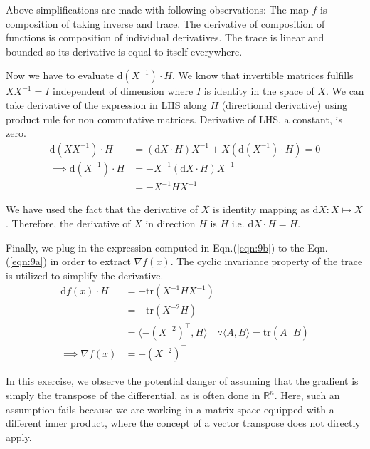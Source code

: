 \documentclass{article}
\begin{document}
\begin{enumerate}[start=9]
\begin{ans_box}
  Above simplifications are made with following observations: The map $f$ is composition of taking inverse and trace. The derivative of composition of functions is composition of individual derivatives. The trace is linear and bounded so its derivative is equal to itself everywhere.\medskip

  Now we have to evaluate $\text{d}(X^{-1})\cdot H$. We know that invertible matrices fulfills $XX^{-1}=I$ independent of dimension where $I$ is identity in the space of $X$. We can take derivative of the expression in LHS along $H$ (directional derivative) using product rule for non commutative matrices. Derivative of LHS, a constant, is zero.
  \begin{equation}
    \begin{split}
      \label{eqn:9b}
      \text{d}(XX^{-1})\cdot H&=(\text{d}X\cdot H)X^{-1}+X\left(\text{d}(X^{-1})\cdot H\right)=0\\
      \implies\text{d}(X^{-1})\cdot H&=-X^{-1}(\text{d}X\cdot H)X^{-1}\\
      &=-X^{-1}HX^{-1}
    \end{split}
  \end{equation}

  We have used the fact that the derivative of $X$ is identity mapping as $\text{d}X:X\mapsto X$. Therefore, the derivative of $X$ in direction $H$ is $H$ i.e. $\text{d}X\cdot H=H$.\medskip

  Finally, we plug in the expression computed in Eqn.(\ref{eqn:9b}) to the Eqn.(\ref{eqn:9a}) in order to extract $\nabla f(x)$. The cyclic invariance property of the trace is utilized to simplify the derivative.
  \begin{equation*}
    \begin{split}
      \text{d}f(x)\cdot H&=-\text{tr}(X^{-1}HX^{-1})\\
      &=-\text{tr}(X^{-2}H)\\
      &=\langle-(X^{-2})^{\top},H\rangle\quad\because\langle A,B\rangle=\text{tr}(A^{\top}B)\\
      \implies\nabla f(x)&=-(X^{-2})^{\top}
    \end{split}
  \end{equation*}

  In this exercise, we observe the potential danger of assuming that the gradient is simply the transpose of the differential, as is often done in $\mathbb{R}^{n}$. Here, such an assumption fails because we are working in a matrix space equipped with a different inner product, where the concept of a vector transpose does not directly apply.
  \end{ans_box}


\end{enumerate}
\end{document}
